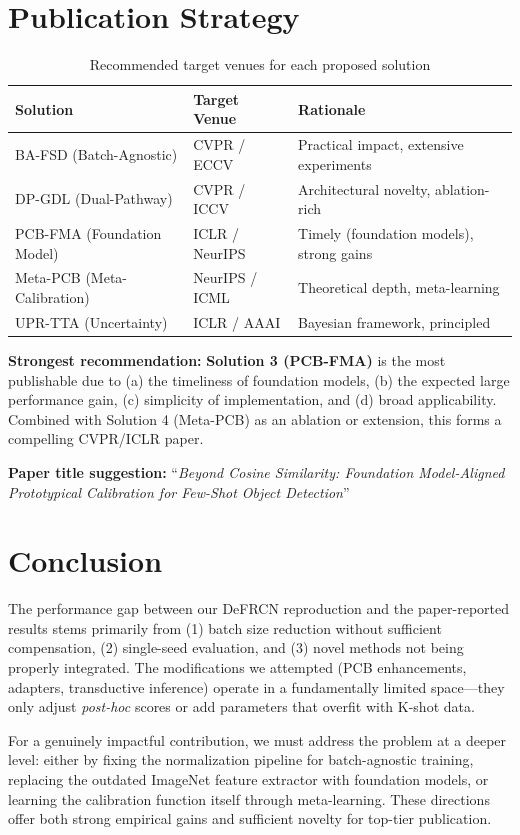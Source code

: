 \documentclass[11pt,a4paper]{article}
\begin{document}
\section{Publication Strategy}

\begin{table}[h]
\centering
\caption{Recommended target venues for each proposed solution}
\begin{tabular}{p{5cm}lp{5cm}}
\toprule
\textbf{Solution} & \textbf{Target Venue} & \textbf{Rationale} \\
\midrule
BA-FSD (Batch-Agnostic) & CVPR / ECCV & Practical impact, extensive experiments \\
DP-GDL (Dual-Pathway) & CVPR / ICCV & Architectural novelty, ablation-rich \\
PCB-FMA (Foundation Model) & ICLR / NeurIPS & Timely (foundation models), strong gains \\
Meta-PCB (Meta-Calibration) & NeurIPS / ICML & Theoretical depth, meta-learning \\
UPR-TTA (Uncertainty) & ICLR / AAAI & Bayesian framework, principled \\
\bottomrule
\end{tabular}
\end{table}

\textbf{Strongest recommendation:} \textbf{Solution 3 (PCB-FMA)} is the most publishable due to (a) the timeliness of foundation models, (b) the expected large performance gain, (c) simplicity of implementation, and (d) broad applicability. Combined with Solution 4 (Meta-PCB) as an ablation or extension, this forms a compelling CVPR/ICLR paper.

\textbf{Paper title suggestion:} ``\textit{Beyond Cosine Similarity: Foundation Model-Aligned Prototypical Calibration for Few-Shot Object Detection}''

\section{Conclusion}

The performance gap between our DeFRCN reproduction and the paper-reported results stems primarily from (1) batch size reduction without sufficient compensation, (2) single-seed evaluation, and (3) novel methods not being properly integrated. The modifications we attempted (PCB enhancements, adapters, transductive inference) operate in a fundamentally limited space---they only adjust \textit{post-hoc} scores or add parameters that overfit with K-shot data.

For a genuinely impactful contribution, we must address the problem at a deeper level: either by fixing the normalization pipeline for batch-agnostic training, replacing the outdated ImageNet feature extractor with foundation models, or learning the calibration function itself through meta-learning. These directions offer both strong empirical gains and sufficient novelty for top-tier publication.
\end{document}
